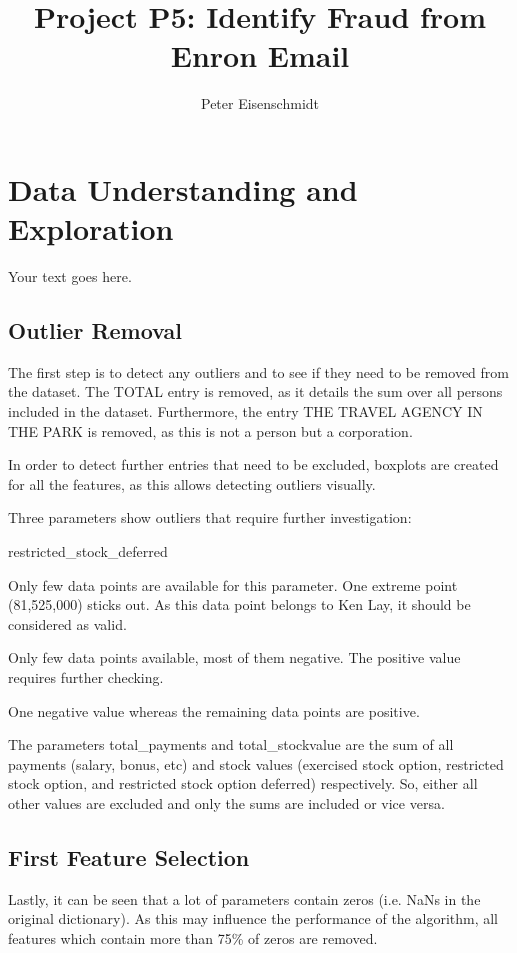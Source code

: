 \documentclass[11pt]{article} %
\title{Project P5: Identify Fraud from Enron Email}
\author{Peter Eisenschmidt}
\begin{document}
\maketitle

\section{Data Understanding and Exploration}

Your text goes here.

\subsection{Outlier Removal}

The first step is to detect any outliers and to see if they need to be removed from the dataset. The TOTAL entry is removed, as it details the sum over all persons included in the dataset.  Furthermore, the entry THE TRAVEL AGENCY IN THE PARK is removed, as this is not a person but a corporation. \medskip

In order to detect further entries that need to be excluded, boxplots are created for all the features, as this allows detecting outliers visually.\medskip

Three parameters show outliers that require further investigation:


\begin{labeling}{restricted\_stock\_deferred}
\item [loan\_advances] Only few data points are available for this parameter. One extreme point (81,525,000) sticks out. As this data point belongs to Ken Lay, it should be considered as valid.
\item [restricted\_stock\_deferred] Only few data points available, most of them negative. The positive value requires further checking. 
\item [restricted\_stock] One negative value whereas the remaining data points are positive.
\end{labeling}

The parameters total\_payments and total\_stockvalue are the sum of all payments (salary, bonus, etc) and stock values (exercised stock option, restricted stock option, and restricted stock option deferred) respectively. So, either all other values are excluded and only the sums are included or vice versa.

\subsection{First Feature Selection}
Lastly, it can be seen that a lot of parameters contain zeros (i.e. NaNs in the original dictionary). As this may influence the performance of the algorithm, all features which contain more than 75\% of zeros are removed.\medskip
\end{document}
